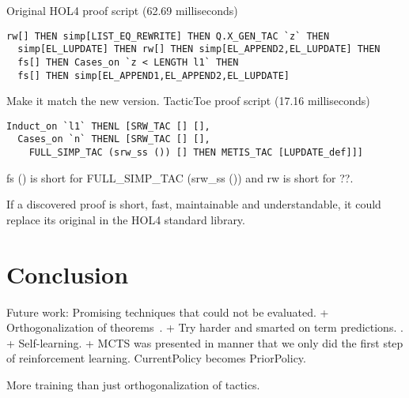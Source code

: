 \documentclass[runningheads,a4paper,draft]{svjour3}
\def\holfour{\textsf{HOL4}\xspace}
\def\hollight{\textsf{HOL Light}\xspace}
\def\tactictoe{\textsf{TacticToe}\xspace}
\begin{document}
\vspace{5mm}

Original \holfour proof script (62.69 milliseconds)
\begin{lstlisting}[language=SMLSmall,frame=tb]
  rw[] THEN simp[LIST_EQ_REWRITE] THEN Q.X_GEN_TAC `z` THEN
  simp[EL_LUPDATE] THEN rw[] THEN simp[EL_APPEND2,EL_LUPDATE] THEN
  fs[] THEN Cases_on `z < LENGTH l1` THEN
  fs[] THEN simp[EL_APPEND1,EL_APPEND2,EL_LUPDATE]
\end{lstlisting}




\vspace{5mm}
Make it match the new version.
\tactictoe proof script (17.16 milliseconds)
\begin{lstlisting}[language=SMLSmall,frame=tb]
Induct_on `l1` THENL [SRW_TAC [] [],
  Cases_on `n` THENL [SRW_TAC [] [],
    FULL_SIMP_TAC (srw_ss ()) [] THEN METIS_TAC [LUPDATE_def]]]
\end{lstlisting}
fs () is short for FULL\_SIMP\_TAC (srw\_ss ()) and rw is short for ??.



If a discovered proof is short, fast, maintainable and 
understandable, it could replace its original in the \holfour standard library.





\section{Conclusion}\label{sec:concl}

Future work:
  Promising techniques that could not be evaluated. 
  + Orthogonalization of theorems~\cite{ckju-jsc15}. 
  + Try harder and smarted on term predictions. \cite{latest version of sepia}. 
  \cite{conjecturing}
  + Self-learning.  
+ MCTS was presented in manner that we only did the first step of reinforcement 
learning. CurrentPolicy becomes PriorPolicy.
 
More training than just orthogonalization of tactics.

\end{document}
